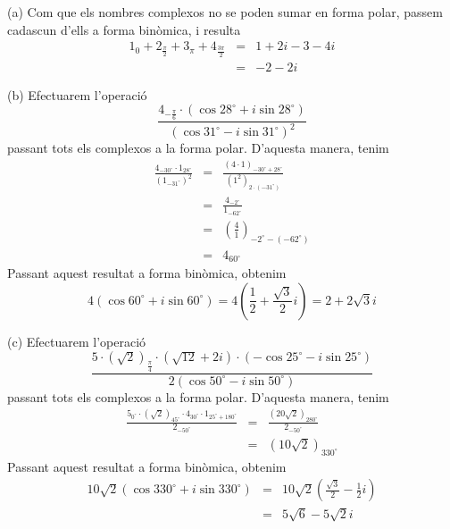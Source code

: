 \begin{solucio}
(a) Com que els nombres complexos no se poden sumar en forma polar,
passem cadascun d’ells a forma binòmica, i resulta
\begin{eqnarray*}
1_{0}+2_{\frac{\pi }{2}}+3_{\pi }+4_{\frac{3\pi }{2}} &=&1+2i-3-4i \\
&=&-2-2i
\end{eqnarray*}

(b) Efectuarem l’operació
\[
\frac{4_{-\frac{\pi }{6}}\cdot (\cos 28
^{\circ}
+i\sin 28
^{\circ}
)}{(\cos 31
^{\circ}
-i\sin 31
^{\circ}
)^{2}}
\]
passant tots els complexos a la forma polar. D’aquesta manera, tenim
\begin{eqnarray*}
\frac{4_{-30
^{\circ}
}\cdot 1_{28
^{\circ}
}}{(1_{-31
^{\circ}
})^{2}} &=&\frac{\left( 4\cdot 1\right) _{-30
^{\circ}
+28
^{\circ}
}}{\left( 1^{2}\right) _{2\cdot (-31
^{\circ}
)}} \\
&=&\frac{4_{-2
^{\circ}
}}{1_{-62
^{\circ}
}} \\
&=&\left( \frac{4}{1}\right) _{-2
^{\circ}
-(-62
^{\circ}
)} \\
&=&4_{60
^{\circ}
}
\end{eqnarray*}
Passant aquest resultat a forma binòmica, obtenim
\[
4(\cos 60
^{\circ}
+i\sin 60
^{\circ}
)=4\left( \frac{1}{2}+\frac{\sqrt{3}}{2}i\right) =2+2\sqrt{3}i
\]

(c) Efectuarem l’operació
\[
\frac{5\cdot \left( \sqrt{2}\right) _{\frac{\pi }{4}}\cdot \left( \sqrt{12}
+2i\right) \cdot (-\cos 25
^{\circ}
-i\sin 25
^{\circ}
)}{2(\cos 50
^{\circ}
-i\sin 50
^{\circ}
)}
\]
passant tots els complexos a la forma polar. D’aquesta manera, tenim
\begin{eqnarray*}
\frac{5_{0
^{\circ}
}\cdot \left( \sqrt{2}\right) _{45
^{\circ}
}\cdot 4_{30
^{\circ}
}\cdot 1_{25
^{\circ}
+180
^{\circ}
}}{2_{-50
^{\circ}
}} &=&\frac{\left( 20\sqrt{2}\right) _{280
^{\circ}
}}{2_{-50
^{\circ}
}} \\
&=&\left( 10\sqrt{2}\right) _{330
^{\circ}
}
\end{eqnarray*}
Passant aquest resultat a forma binòmica, obtenim
\begin{eqnarray*}
10\sqrt{2}(\cos 330
^{\circ}
+i\sin 330
^{\circ}
) &=&10\sqrt{2}\left( \frac{\sqrt{3}}{2}-\frac{1}{2}i\right) \\
&=&5\sqrt{6}-5\sqrt{2}i
\end{eqnarray*}
\end{solucio}

